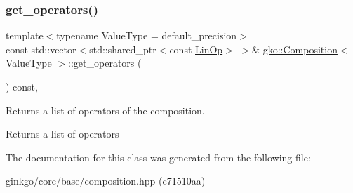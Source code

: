 \subsubsection{\texorpdfstring{get\+\_\+operators()}{get\_operators()}}
{\footnotesize\ttfamily template$<$typename Value\+Type  = default\+\_\+precision$>$ \\
const std\+::vector$<$std\+::shared\+\_\+ptr$<$const \hyperlink{classgko_1_1LinOp}{Lin\+Op}$>$ $>$\& \hyperlink{classgko_1_1Composition}{gko\+::\+Composition}$<$ Value\+Type $>$\+::get\+\_\+operators (\begin{DoxyParamCaption}{ }\end{DoxyParamCaption}) const\hspace{0.3cm}{\ttfamily [inline]}, {\ttfamily [noexcept]}}



Returns a list of operators of the composition. 

\begin{DoxyReturn}{Returns}
a list of operators 
\end{DoxyReturn}


The documentation for this class was generated from the following file\+:\begin{DoxyCompactItemize}
\item 
ginkgo/core/base/composition.\+hpp (c71510aa)\end{DoxyCompactItemize}
